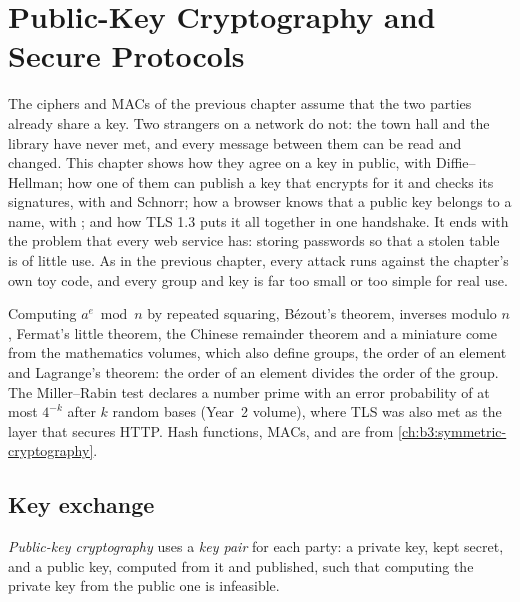 \chapter{Public-Key Cryptography and Secure Protocols}\label{ch:b3:public-key-cryptography}

The ciphers and MACs of the previous chapter assume that the two parties already share a key. Two strangers on a network do not: the town hall and the library have never met, and every message between them can be read and changed. This chapter shows how they agree on a key in public, with Diffie--Hellman; how one of them can publish a key that encrypts for it and checks its signatures, with  and Schnorr; how a browser knows that a public key belongs to a name, with ; and how TLS 1.3 puts it all together in one handshake. It ends with the problem that every web service has: storing passwords so that a stolen table is of little use. As in the previous chapter, every attack runs against the chapter's own toy code, and every group and key is far too small or too simple for real use.

\begin{recall}
Computing $a^e \bmod n$ by repeated squaring, Bézout's theorem, inverses modulo $n$, Fermat's little theorem, the Chinese remainder theorem and a miniature  come from the mathematics volumes, which also define groups, the order of an element and Lagrange's theorem: the order of an element divides the order of the group. The Miller--Rabin test declares a number prime with an error probability of at most $4^{-k}$ after $k$ random bases (Year~2 volume), where TLS was also met as the layer that secures HTTP. Hash functions, MACs,  and  are from \cref{ch:b3:symmetric-cryptography}.
\end{recall}

\section{Key exchange}\label{sec:b3:public-key-cryptography:dh}

\begin{definition}\label{def:b3:public-key-cryptography:pk}
\emph{Public-key cryptography} uses a \emph{key pair} for each party: a private key, kept secret, and a public key, computed from it and published, such that computing the private key from the public one is infeasible.
\end{definition}

